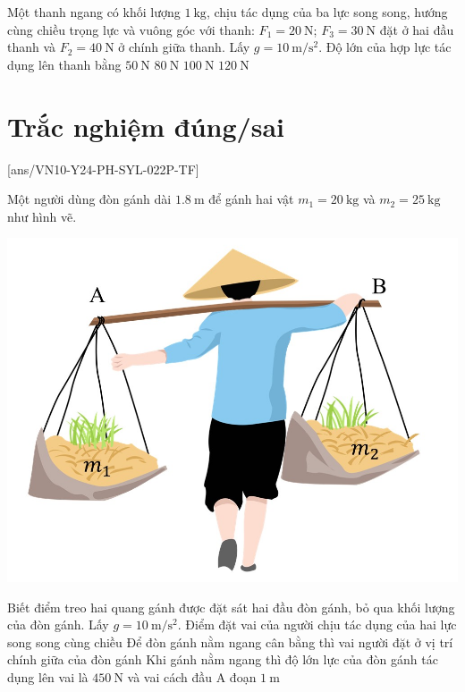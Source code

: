 \begin{ex}
	Một thanh ngang có khối lượng $\SI{1}{\kilogram}$, chịu tác dụng của ba lực song song, hướng cùng chiều trọng lực và vuông góc với thanh: $F_1=\SI{20}{\newton}$; $F_3=\SI{30}{\newton}$ đặt ở hai đầu thanh và $F_2=\SI{40}{\newton}$ ở chính giữa thanh. Lấy $g=\SI{10}{\meter/\second^2}$. Độ lớn của hợp lực tác dụng lên thanh bằng
	\choice
	{$\SI{50}{\newton}$}
	{$\SI{80}{\newton}$}
	{\True $\SI{100}{\newton}$}
	{$\SI{120}{\newton}$}
\end{ex}
\section{Trắc nghiệm đúng/sai}
\setcounter{ex}{0}
[ans/VN10-Y24-PH-SYL-022P-TF]
\begin{ex}
	Một người dùng đòn gánh dài $\SI{1.8}{\meter}$ để gánh hai vật $m_1=\SI{20}{\kilogram}$ và $m_2=\SI{25}{\kilogram}$ như hình vẽ. 
	\begin{center}
		\includegraphics[width=0.3\linewidth]{../figs/VN10-2023-PH-TP022-P-1}
	\end{center}
	Biết điểm treo hai quang gánh được đặt sát hai đầu đòn gánh, bỏ qua khối lượng của đòn gánh.  Lấy $g=\SI{10}{\meter/\second^2}$.
	{\True Điểm đặt vai của người chịu tác dụng của hai lực song song cùng chiều}
	{Để đòn gánh nằm ngang cân bằng thì vai người đặt ở vị trí chính giữa của đòn gánh}
	{\True Khi gánh nằm ngang thì độ lớn lực của đòn gánh tác dụng lên vai là $\SI{450}{\newton}$ và vai cách đầu A đoạn $\SI{1}{\meter}$}
\end{ex}
